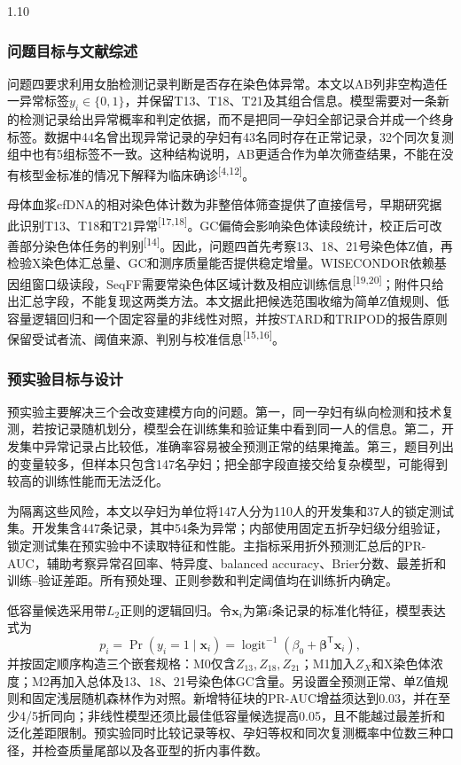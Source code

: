 \documentclass[12pt,a4paper]{ctexrep}
\numberwithin{equation}{section}
\newcommand{\citeup}[1]{\textsuperscript{[#1]}}
\begin{document}
\begin{spacing}{1.10}
{			\subsubsection{问题目标与文献综述}
			问题四要求利用女胎检测记录判断是否存在染色体异常。本文以AB列非空构造任一异常标签$y_i\in\{0,1\}$，并保留T13、T18、T21及其组合信息。模型需要对一条新的检测记录给出异常概率和判定依据，而不是把同一孕妇全部记录合并成一个终身标签。数据中44名曾出现异常记录的孕妇有43名同时存在正常记录，32个同次复测组中也有5组标签不一致。这种结构说明，AB更适合作为单次筛查结果，不能在没有核型金标准的情况下解释为临床确诊\citeup{4,12}。

			母体血浆cfDNA的相对染色体计数为非整倍体筛查提供了直接信号，早期研究据此识别T13、T18和T21异常\citeup{17,18}。GC偏倚会影响染色体读段统计，校正后可改善部分染色体任务的判别\citeup{14}。因此，问题四首先考察13、18、21号染色体Z值，再检验X染色体汇总量、GC和测序质量能否提供稳定增量。WISECONDOR依赖基因组窗口级读段，SeqFF需要常染色体区域计数及相应训练信息\citeup{19,20}；附件只给出汇总字段，不能复现这两类方法。本文据此把候选范围收缩为简单Z值规则、低容量逻辑回归和一个固定容量的非线性对照，并按STARD和TRIPOD的报告原则保留受试者流、阈值来源、判别与校准信息\citeup{15,16}。

			\subsubsection{预实验目标与设计}
			预实验主要解决三个会改变建模方向的问题。第一，同一孕妇有纵向检测和技术复测，若按记录随机划分，模型会在训练集和验证集中看到同一人的信息。第二，开发集中异常记录占比较低，准确率容易被全预测正常的结果掩盖。第三，题目列出的变量较多，但样本只包含147名孕妇；把全部字段直接交给复杂模型，可能得到较高的训练性能而无法泛化。

			为隔离这些风险，本文以孕妇为单位将147人分为110人的开发集和37人的锁定测试集。开发集含447条记录，其中54条为异常；内部使用固定五折孕妇级分组验证，锁定测试集在预实验中不读取特征和性能。主指标采用折外预测汇总后的PR-AUC，辅助考察异常召回率、特异度、balanced accuracy、Brier分数、最差折和训练--验证差距。所有预处理、正则参数和判定阈值均在训练折内确定。

			低容量候选采用带$L_2$正则的逻辑回归。令$\boldsymbol{x}_i$为第$i$条记录的标准化特征，模型表达式为
			\begin{equation}
			p_i=\Pr(y_i=1\mid\boldsymbol{x}_i)
			=\operatorname{logit}^{-1}\!\left(\beta_0+\boldsymbol{\beta}^{\mathsf T}\boldsymbol{x}_i\right),
			\label{eq:q4_pilot_logistic}
			\end{equation}
			并按固定顺序构造三个嵌套规格：M0仅含$Z_{13},Z_{18},Z_{21}$；M1加入$Z_X$和X染色体浓度；M2再加入总体及13、18、21号染色体GC含量。另设置全预测正常、单Z值规则和固定浅层随机森林作为对照。新增特征块的PR-AUC增益须达到0.03，并在至少4/5折同向；非线性模型还须比最佳低容量候选提高0.05，且不能越过最差折和泛化差距限制。预实验同时比较记录等权、孕妇等权和同次复测概率中位数三种口径，并检查质量尾部以及各亚型的折内事件数。

}
\end{spacing}
\end{document}
